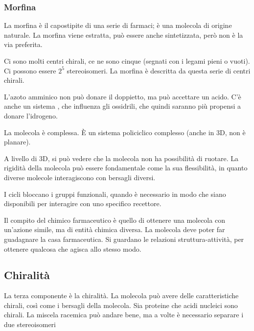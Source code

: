 \clearpage

\subsubsection{Morfina}

La morfina è il capostipite di una serie di farmaci; è una molecola di origine naturale. La
morfina viene estratta, può essere anche sintetizzata, però non è la via
preferita.

Ci sono molti centri chirali, ce ne sono cinque (segnati con i legami
pieni o vuoti). Ci possono essere \(2^5\) stereoisomeri. La morfina è
descritta da questa serie di centri chirali.

L'azoto amminico non può donare il doppietto, ma può accettare un acido.
C'è anche un sistema \pi, che influenza gli ossidrili, che quindi saranno
più propensi a donare l'idrogeno.

La molecola è complessa. È un sistema policiclico complesso (anche in
3D, non è planare).

A livello di 3D, si può vedere che la molecola non ha possibilità di
ruotare. La rigidità della molecola può essere fondamentale come la sua
flessibilità, in quanto diverse molecole interagiscono con bersagli
diversi.

I cicli bloccano i gruppi funzionali, quando è necessario in modo che
siano disponibili per interagire con uno specifico recettore.


Il compito del chimico farmaceutico è quello di ottenere una molecola
con un'azione simile, ma di entità chimica diversa. La molecola deve
poter far guadagnare la casa farmaceutica. Si guardano le relazioni
struttura-attività, per ottenere qualcosa che agisca allo stesso modo.


\subsection{Chiralità}

La terza componente è la chiralità. La molecola può avere delle
caratteristiche chirali, così come i bersagli della molecola. Sia
proteine che acidi nucleici sono chirali.
La miscela racemica può andare bene, ma a volte è necessario separare i due
stereoisomeri


